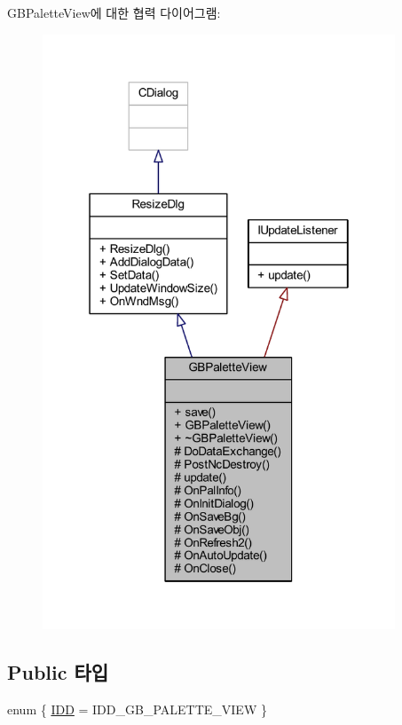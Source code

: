 G\+B\+Palette\+View에 대한 협력 다이어그램\+:\nopagebreak
\begin{figure}[H]
\begin{center}
\leavevmode
\includegraphics[width=298pt]{class_g_b_palette_view__coll__graph}
\end{center}
\end{figure}
\subsection*{Public 타입}
\begin{DoxyCompactItemize}
\item 
enum \{ \mbox{\hyperlink{class_g_b_palette_view_a523298d9315ba49a30c3982b035329fba31059a608a51ee0b70c6cf968a4ec9ed}{I\+DD}} = I\+D\+D\+\_\+\+G\+B\+\_\+\+P\+A\+L\+E\+T\+T\+E\+\_\+\+V\+I\+EW
 \}
\end{DoxyCompactItemize}
